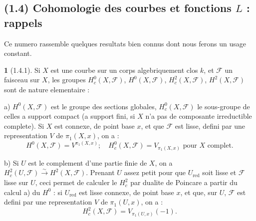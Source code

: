 \documentclass[12pt,a4paper]{article}
\theoremstyle{plain}
\theoremstyle{definition}
\theoremstyle{definition}
\newtheorem{para}{}[section]
\theoremstyle{remark}
\begin{document}
\newpage

\subsection*{(1.4) Cohomologie des courbes et fonctions $L$ : rappels}

Ce numero rassemble quelques resultats bien connus dont nous ferons un usage constant.

\begin{para}[1.4.1]
Si $X$ est une courbe sur un corps algebriquement clos $k$, et $\mathscr{F}$ un faisceau sur $X$, les groupes $H_c^0(X, \mathscr{F})$, $H^0(X, \mathscr{F})$, $H_c^2(X, \mathscr{F})$, $H^2(X, \mathscr{F})$ sont de nature elementaire :

a) $H^0(X, \mathscr{F})$ est le groupe des sections globales, $H_c^0(X, \mathscr{F})$ le sous-groupe de celles a support compact (a support fini, si $X$ n'a pas de composante irreductible complete). Si $X$ est connexe, de point base $x$, et que $\mathscr{F}$ est lisse, defini par une representation $V$ de $\pi_1(X, x)$, on a :
\begin{equation}\tag{1.4.1.1}
H^0(X, \mathscr{F}) = V^{\pi_1(X, x)}; \quad H_c^0(X, \mathscr{F}) = V_{\pi_1(X, x)} \text{ pour $X$ complet.}
\end{equation}

b) Si $U$ est le complement d'une partie finie de $X$, on a $H_c^2(U, \mathscr{F}) \xrightarrow{\sim} H^2(X, \mathscr{F})$. Prenant $U$ assez petit pour que $U_{\text{red}}$ soit lisse et $\mathscr{F}$ lisse sur $U$, ceci permet de calculer le $H_c^2$ par dualite de Poincare a partir du calcul a) du $H^0$ : si $U_{\text{red}}$ est lisse connexe, de point base $x$, et que, sur $U$, $\mathscr{F}$ est defini par une representation $V$ de $\pi_1(U, x)$, on a :
\begin{equation}\tag{1.4.1.2}
H_c^2(X, \mathscr{F}) = V_{\pi_1(U, x)}(-1).
\end{equation}
\end{para}
\end{document}
